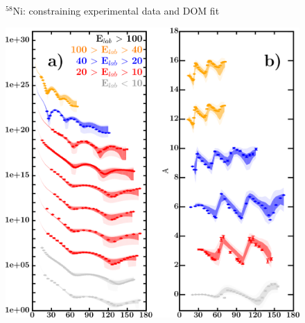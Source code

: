 \documentclass[twocolumn,secnumarabic,amssymb, nobibnotes, aps, prl,
superscriptaddress, nobalancelastpage, draft]{revtex4}
\newcommand{\niEight}{\ensuremath{^{58}}N\lowercase{i}}
\begin{document}
\begin{figure}[!htb]
\begin{minipage}{0.4\linewidth}
        \label{DOM_ni58_BE}
    \end{minipage}
    \caption{\niEight: constraining experimental data and DOM fit}
    \label{DOM_ni58_structural}
\end{figure}

\begin{figure}[!htb]
    \centering
    \begin{minipage}{0.4\linewidth}
        \centering
        \includegraphics[width=\linewidth]{figures/ni64_protonElastic.png}
        \label{DOM_ni64_proton_elastic}
    \end{minipage}\hspace{6pt}
    \begin{minipage}{0.4\linewidth}
        \centering
        \vspace{-10pt}
        \begin{minipage}[c]{0.5\linewidth}
            \centering

\end{minipage}
\end{minipage}
\end{figure}
\end{document}
